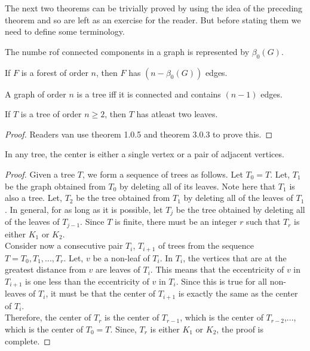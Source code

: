 \documentclass[../basic_graph_theory.tex]{subfiles}
\begin{document}
The next two theorems can be trivially proved by using the idea of the preceding theorem and so are left as an exercise for the reader. But before stating them we need to define some terminology.

\begin{defn}
    The numbe rof connected components in a graph is represented by $\beta_{0}(G)$.
\end{defn}

\begin{thm}
    If $F$ is a forest of order $n$, then $F$ has $(n-\beta_{0}(G))$ edges.
\end{thm}

\begin{thm}
    A graph of order $n$ is a tree iff it is connected and contains $(n-1)$ edges.
\end{thm}

\begin{thm}
    If $T$ is a tree of order $n \ge 2$, then $T$ has atleast two leaves.
\end{thm}
\begin{proof}
    Readers van use theorem 1.0.5 and theorem 3.0.3 to prove this.
\end{proof}

\begin{thm}
    In any tree, the center is either a single vertex or a pair of adjacent vertices.
\end{thm}
\begin{proof}
    Given a tree $T$, we form a sequence of trees as follows. Let $T_0 = T$. Let, $T_1$ be the graph obtained from $T_0$ by deleting all of its leaves. Note here that $T_1$ is also a tree. Let, $T_2$ be the tree obtained from $T_1$ by deleting all of the leaves of $T_1$. In general, for as long as it is possible, let $T_j$ be the tree obtained by deleting all of the leaves of $T_{j-1}$. Since $T$ is finite, there must be an integer $r$ such that $T_r$ is either $K_1$ or $K_2$.\\
    Consider now a consecutive pair $T_i$, $T_{i+1}$ of trees from the sequence $T=T_0, T_1,..., T_r$. Let, $v$ be a non-leaf of $T_i$. In $T_i$, the vertices that are at the greatest distance from $v$ are leaves of $T_i$. This means that the eccentricity of $v$ in $T_{i+1}$ is one less than the eccentricity of $v$ in $T_i$. Since this is true for all non-leaves of $T_i$, it must be that the center of $T_{i+1}$ is exactly the same as the center of $T_i$.\\
    Therefore, the center of $T_r$ is the center of $T_{r-1}$, which is the center of $T_{r-2}$,..., which is the center of $T_0=T$. Since, $T_r$ is either $K_1$ or $K_2$, the proof is complete.
\end{proof}
\end{document}
